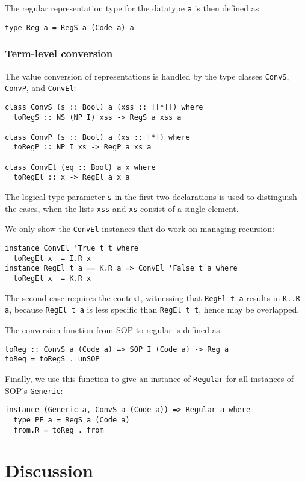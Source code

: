 \documentclass[runningheads]{llncs}
\newcommand{\K}[1]{\lstinline[style=fancy]{#1}}
\begin{document}
The \textsf{regular} representation type for the datatype \K{a} is then defined as
\begin{lstlisting}[style=fancy]
type Reg a = RegS a (Code a) a
\end{lstlisting}

\subsubsection{Term-level conversion}

The value conversion of representations is handled by the type classes \K{ConvS}, \K{ConvP}, and \K{ConvEl}:
\begin{lstlisting}[style=fancy]
class ConvS (s :: Bool) a (xss :: [[*]]) where
  toRegS :: NS (NP I) xss -> RegS a xss a

class ConvP (s :: Bool) a (xs :: [*]) where
  toRegP :: NP I xs -> RegP a xs a

class ConvEl (eq :: Bool) a x where
  toRegEl :: x -> RegEl a x a
\end{lstlisting}
The logical type parameter \K{s} in the first two declarations is used to distinguish the cases, when the lists \K{xss} and \K{xs} consist of a single element.

We only show the \K{ConvEl} instances that do work on managing recursion:
\begin{lstlisting}[style=fancy]
instance ConvEl 'True t t where
  toRegEl x  = I.R x
instance RegEl t a == K.R a => ConvEl 'False t a where
  toRegEl x  = K.R x
\end{lstlisting}
The second case requires the context, witnessing that \K{RegEl t a} results in \K{K..R a}, because \K{RegEl t a} is less specific than \K{RegEl t t}, hence may be overlapped.

The conversion function from SOP to \textsf{regular} is defined as
\begin{lstlisting}[style=fancy]
toReg :: ConvS a (Code a) => SOP I (Code a) -> Reg a
toReg = toRegS . unSOP
\end{lstlisting}

Finally, we use this function to give an instance of \K{Regular} for all instances of SOP's \K{Generic}:
\begin{lstlisting}[style=fancy]
instance (Generic a, ConvS a (Code a)) => Regular a where
  type PF a = RegS a (Code a)
  from.R = toReg . from
\end{lstlisting}


\section{Discussion}
\label{sec:discussion}
\end{document}
